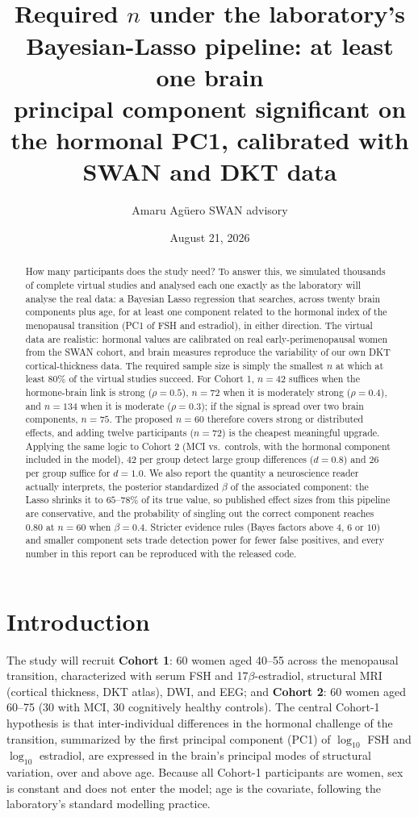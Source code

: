 \documentclass[11pt,a4paper]{article}
\title{\vspace{-1.2em}{\color{NavyInk}\bfseries\LARGE Bayesian Sample Size Determination for\\[2pt]
``The Menopausal Transition as a Probe of Neural Vulnerability''}\\[6pt]
{\large\color{SoftGrey} Required $n$ under the laboratory's Bayesian-Lasso pipeline: at least one brain\\ principal component significant on the hormonal PC1, calibrated with SWAN and DKT data}}
\author{Amaru Ag\"uero \; \textperiodcentered\; SWAN advisory}
\date{August 21, 2026}
\begin{document}
\maketitle
\vspace{-1.4em}

\begin{abstract}
\noindent How many participants does the study need? To answer this, we simulated thousands of complete virtual studies and analysed each one exactly as the laboratory will analyse the real data: a Bayesian Lasso regression that searches, across twenty brain components plus age, for at least one component related to the hormonal index of the menopausal transition (PC1 of FSH and estradiol), in either direction. The virtual data are realistic: hormonal values are calibrated on real early-perimenopausal women from the SWAN cohort, and brain measures reproduce the variability of our own DKT cortical-thickness data. The required sample size is simply the smallest $n$ at which at least $80\%$ of the virtual studies succeed. For Cohort 1, $n=42$ suffices when the hormone-brain link is strong ($\rho=0.5$), $n=72$ when it is moderately strong ($\rho=0.4$), and $n=134$ when it is moderate ($\rho=0.3$); if the signal is spread over two brain components, $n=75$. The proposed $n=60$ therefore covers strong or distributed effects, and adding twelve participants ($n=72$) is the cheapest meaningful upgrade. Applying the same logic to Cohort 2 (MCI vs.\ controls, with the hormonal component included in the model), $42$ per group detect large group differences ($d=0.8$) and $26$ per group suffice for $d=1.0$. We also report the quantity a neuroscience reader actually interprets, the posterior standardized $\beta$ of the associated component: the Lasso shrinks it to $65$--$78\%$ of its true value, so published effect sizes from this pipeline are conservative, and the probability of singling out the correct component reaches $0.80$ at $n=60$ when $\beta=0.4$. Stricter evidence rules (Bayes factors above $4$, $6$ or $10$) and smaller component sets trade detection power for fewer false positives, and every number in this report can be reproduced with the released code.
\end{abstract}

\section{Introduction}

The study will recruit \textbf{Cohort 1}: $60$ women aged 40--55 across the menopausal transition, characterized with serum FSH and 17$\beta$-estradiol, structural MRI (cortical thickness, DKT atlas), DWI, and EEG; and \textbf{Cohort 2}: $60$ women aged 60--75 ($30$ with MCI, $30$ cognitively healthy controls). The central Cohort-1 hypothesis is that inter-individual differences in the hormonal challenge of the transition, summarized by the first principal component (PC1) of $\log_{10}$ FSH and $\log_{10}$ estradiol, are expressed in the brain's principal modes of structural variation, over and above age. Because all Cohort-1 participants are women, sex is constant and does not enter the model; age is the covariate, following the laboratory's standard modelling practice.
\end{document}
